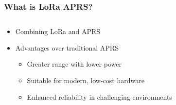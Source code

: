 \documentclass[aspectratio=169]{beamer}
\begin{document}
\begin{frame}[t]
  \frametitle{What is LoRa APRS?}
  \begin{columns}
    \begin{column}{0.66\textwidth}
      \begin{itemize}
        \item Combining LoRa and APRS
        \medskip
        \item Advantages over traditional APRS
        \medskip
        \begin{itemize}
          \item Greater range with lower power
          \medskip
          \item Suitable for modern, low-cost hardware
          \medskip
          \item Enhanced reliability in challenging environments
        \end{itemize}
      \end{itemize}
    \end{column}
    \begin{column}{0.33\textwidth}
    \end{column}
  \end{columns}
\end{frame}
\end{document}
